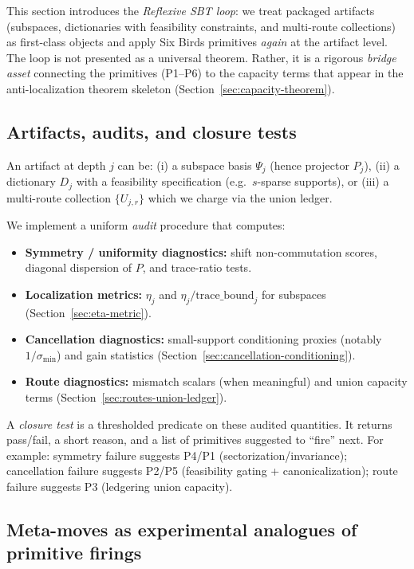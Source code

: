 \documentclass[11pt]{article}
\theoremstyle{plain}
\theoremstyle{definition}
\theoremstyle{remark}
\begin{document}
This section introduces the \emph{Reflexive SBT loop}: we treat packaged artifacts (subspaces, dictionaries with feasibility constraints, and multi-route collections) as first-class objects and apply Six Birds primitives \emph{again} at the artifact level.
The loop is not presented as a universal theorem.
Rather, it is a rigorous \emph{bridge asset} connecting the primitives (P1--P6) to the capacity terms that appear in the anti-localization theorem skeleton (Section~\ref{sec:capacity-theorem}).

\subsection{Artifacts, audits, and closure tests}\label{subsec:audits-closure}

An artifact at depth \(j\) can be:
(i) a subspace basis \(\Psi_j\) (hence projector \(P_j\)),
(ii) a dictionary \(D_j\) with a feasibility specification (e.g.\ \(s\)-sparse supports),
or (iii) a multi-route collection \(\{U_{j,r}\}\) which we charge via the union ledger.

We implement a uniform \emph{audit} procedure that computes:
\begin{itemize}
  \item \textbf{Symmetry / uniformity diagnostics:} shift non-commutation scores, diagonal dispersion of \(P\), and trace-ratio tests.
  \item \textbf{Localization metrics:} \(\eta_j\) and \(\eta_j/\mathrm{trace\_bound}_j\) for subspaces (Section~\ref{sec:eta-metric}).
  \item \textbf{Cancellation diagnostics:} small-support conditioning proxies (notably $1/\sigma_{\min}$) and gain statistics (Section~\ref{sec:cancellation-conditioning}).
  \item \textbf{Route diagnostics:} mismatch scalars (when meaningful) and union capacity terms (Section~\ref{sec:routes-union-ledger}).
\end{itemize}

A \emph{closure test} is a thresholded predicate on these audited quantities.
It returns pass/fail, a short reason, and a list of primitives suggested to ``fire'' next.
For example: symmetry failure suggests P4/P1 (sectorization/invariance); cancellation failure suggests P2/P5 (feasibility gating + canonicalization); route failure suggests P3 (ledgering union capacity).

\subsection{Meta-moves as experimental analogues of primitive firings}\label{subsec:meta-moves}
\end{document}
